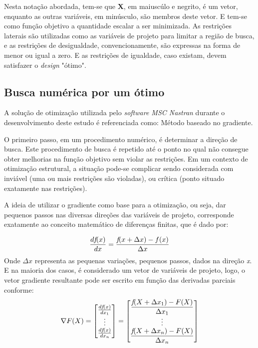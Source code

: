 Nesta notação abordada, tem-se que \textbf{X}, em maiuscúlo e negrito, é um vetor, enquanto as outras variáveis, em minúsculo, são membros deste vetor. E tem-se como função objetivo a quantidade escalar a ser minimizada. As restrições laterais são utilizadas como as variáveis de projeto para limitar a região de busca, e as restrições de desigualdade, convencionamente, são expressas na forma de menor ou igual a zero. E as restrições de igualdade, caso existam, devem satisfazer o \emph{design} "ótimo".

\subsection{Busca numérica por um ótimo}
A solução de otimização utilizada pelo \emph{software MSC Nastran} durante o desenvolvimento deste estudo é referenciada como: Método baseado no gradiente.

O primeiro passo, em um procedimento numérico, é determinar a direção de busca. Este procedimento de busca é repetido até o ponto no qual não consegue obter melhorias na função objetivo sem violar as restrições. Em um contexto de otimização estrutural, a situação pode-se complicar sendo considerada com inviável (uma ou mais restrições são violadas), ou crítica (ponto situado exatamente nas restrições).

A ideia de utilizar o gradiente como base para a otimização, ou seja, dar pequenos passos nas diversas direções das variáveis de projeto, corresponde exatamente ao conceito matemático de diferenças finitas, que é dado por:

\begin{equation} \label{otimization_5}
\frac{d\emph{f}(x)}{dx} = \dfrac{\emph{f}(x + \Delta x)-f(x)}{\Delta x}
\end{equation}
Onde ${\Delta x}$ representa as pequenas variações, pequenos passos, dados na direção \emph{x}. E na maioria dos casos, é considerado um vetor de variáveis de projeto, logo, o vetor gradiente resultante pode ser escrito em função das derivadas parciais conforme:
\begin{equation} \label{otimization_6}
\nabla F(X) =
\begin{bmatrix}
    \frac{d\emph{f}(x)}{dx_1} \\
    \vdots\\
    \frac{d\emph{f}(x)}{dx_n}
\end{bmatrix}
=
\begin{bmatrix}
    \dfrac{\emph{f}(X + \Delta x_1)-F(X)}{\Delta x_1}\\
    \vdots\\
    \dfrac{\emph{f}(X + \Delta x_n)-F(X)}{\Delta x_n}
\end{bmatrix}
\end{equation}

